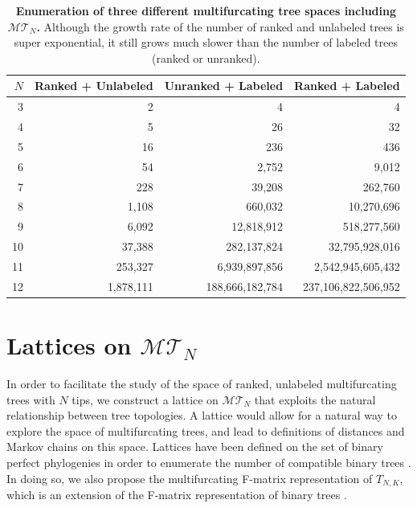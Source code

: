 \documentclass{article}
\begin{document}
\begin{table}[H]
\begin{tabular}{r|rrr|}
$N$ & Ranked + Unlabeled & Unranked + Labeled & Ranked + Labeled \\ \hline 
3   & 2                  & 4                  & 4                \\
4   & 5                  & 26                 & 32               \\
5   & 16                 & 236                & 436              \\
6   & 54                 & 2,752              & 9,012            \\
7   & 228                & 39,208             & 262,760          \\
8   & 1,108              & 660,032            & 10,270,696      \\ 
9 & 6,092 & 12,818,912 & 518,277,560 \\ 
10 & 37,388 & 282,137,824 & 32,795,928,016 \\ 
11 & 253,327 & 6,939,897,856 & 2,542,945,605,432 \\
12 & 1,878,111 & 188,666,182,784 & 237,106,822,506,952
\end{tabular}
\caption{\textbf{Enumeration of three different multifurcating tree spaces including $\mathcal{MT}_N$.} Although the growth rate of the number of ranked and unlabeled trees is super exponential, it still grows much slower than the number of labeled trees (ranked or unranked). } 
\label{tab:num_multif_compare}
\end{table}

\section{Lattices on $\mathcal{MT}_N$} 
\label{sec:lattice}

In order to facilitate the study of the space of ranked, unlabeled multifurcating trees with $N$ tips, we construct a lattice on $\mathcal{MT}_N$ that exploits the natural relationship between tree topologies. A lattice would allow for a natural way to explore the space of multifurcating trees, and lead to definitions of distances and Markov chains on this space. Lattices have been defined on the set of binary perfect phylogenies in order to enumerate the number of compatible binary trees \citep{palacios2022enumeration}. In doing so, we also propose the multifurcating F-matrix representation of $T_{N,K}$, which is an extension of the F-matrix representation of binary trees \citep{Kim2020}. \\
\end{document}
